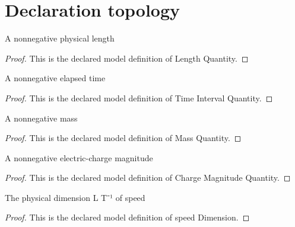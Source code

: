 \section{Declaration topology}
\begin{definition}
  \label{def:physics:phyx-mini-0496:phyxminiproblems-problemphyxmini0496-lengthquantity}
  A nonnegative physical length
\end{definition}
\begin{proof}
  This is the declared model definition of Length Quantity.
\end{proof}
\begin{definition}
  \label{def:physics:phyx-mini-0496:phyxminiproblems-problemphyxmini0496-timeintervalquantity}
  A nonnegative elapsed time
\end{definition}
\begin{proof}
  This is the declared model definition of Time Interval Quantity.
\end{proof}
\begin{definition}
  \label{def:physics:phyx-mini-0496:phyxminiproblems-problemphyxmini0496-massquantity}
  A nonnegative mass
\end{definition}
\begin{proof}
  This is the declared model definition of Mass Quantity.
\end{proof}
\begin{definition}
  \label{def:physics:phyx-mini-0496:phyxminiproblems-problemphyxmini0496-chargemagnitudequantity}
  A nonnegative electric-charge magnitude
\end{definition}
\begin{proof}
  This is the declared model definition of Charge Magnitude Quantity.
\end{proof}
\begin{definition}
  \label{def:physics:phyx-mini-0496:phyxminiproblems-problemphyxmini0496-speeddimension}
  The physical dimension L T⁻¹ of speed
\end{definition}
\begin{proof}
  This is the declared model definition of speed Dimension.
\end{proof}
